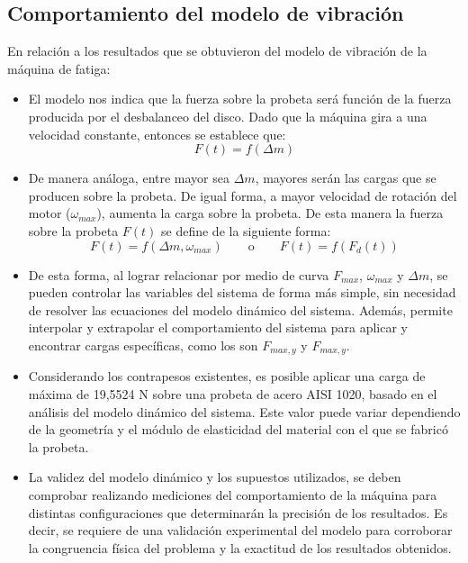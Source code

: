 \subsection{Comportamiento del modelo de vibración}
En relación a los resultados que se obtuvieron del modelo de vibración de la máquina de fatiga:
\begin{itemize}
	\item El modelo nos indica que la fuerza sobre la probeta será función de la fuerza producida por el desbalanceo del disco. Dado que la máquina gira a una velocidad constante, entonces se establece que:
	\begin{equation*}
		F(t) = f(\Delta m)
	\end{equation*}
	\item De manera análoga, entre mayor sea $\Delta m$, mayores serán las cargas que se producen sobre la probeta. De igual forma, a mayor velocidad de rotación del motor ($\omega_{max}$), aumenta la carga sobre la probeta. De esta manera la fuerza sobre la probeta $F(t)$ se define de la siguiente forma:
	\begin{equation*}
		F(t) = f (\Delta m, \omega_{max}) \qquad \text{o} \qquad F(t) = f(F_d(t))
	\end{equation*}
	\item De esta forma, al lograr relacionar por medio de curva $F_{max}$, $\omega_{max}$ y $\Delta m$, se pueden controlar las variables del sistema de forma más simple, sin necesidad de resolver las ecuaciones del modelo dinámico del sistema. Además, permite interpolar y extrapolar el comportamiento del sistema para aplicar y encontrar cargas específicas, como los son $F_{max,y}$ y $F_{max,y}$.
	\item Considerando los contrapesos existentes, es posible aplicar una carga de máxima de 19,5524 N sobre una probeta de acero AISI 1020, basado en el análisis del modelo dinámico del sistema. Este valor puede variar dependiendo de la geometría y el módulo de elasticidad del material con el que se fabricó la probeta.
	\item La validez del modelo dinámico y los supuestos utilizados, se deben comprobar realizando mediciones del comportamiento de la máquina para distintas configuraciones que determinarán la precisión de los resultados. Es decir, se requiere de una validación experimental del modelo para corroborar la congruencia física del problema y la exactitud de los resultados obtenidos.
\end{itemize}

